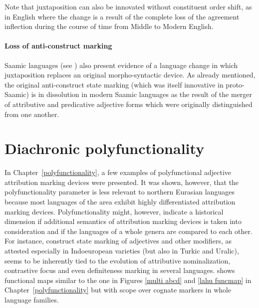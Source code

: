 {Note that juxtaposition can also be innovated without constituent order shift, as in English where the change is a result of the complete loss of the agreement inflection during the course of time from Middle to Modern English. 

\paragraph{Loss of anti-construct marking}
Saamic languages (see ) also present evidence of a language change in which juxtaposition replaces an original morpho-syntactic device. As already mentioned, the original anti-construct state marking (which was itself innovative in proto-Saamic) is in dissolution in modern Saamic languages as the result of the merger of attributive and predicative adjective forms which were originally distinguished from one another.

\section{Diachronic polyfunctionality}
In Chapter~\ref{polyfunctionality}, a few examples of polyfunctional adjective attribution marking devices were presented. It was shown, however, that the polyfunctionality parameter is less relevant to northern Eurasian languages because most languages of the area exhibit highly differentiated attribution marking devices. Polyfunctionality might, however, indicate a historical dimension if additional semantics of attribution marking devices is taken into consideration and if the languages of a whole genera are compared to each other. For instance, construct state marking of adjectives and other modifiers, as attested especially in Indoeuropean varieties (but also in Turkic and Uralic), seems to be inherently tied to the evolution of attributive nominalization, contrastive focus and even definiteness marking in several languages.  shows functional maps similar to the one in Figures \ref{multi abcd} and \ref{lahu funcmap} in Chapter~\ref{polyfunctionality} but with scope over cognate markers in whole language families.

}

